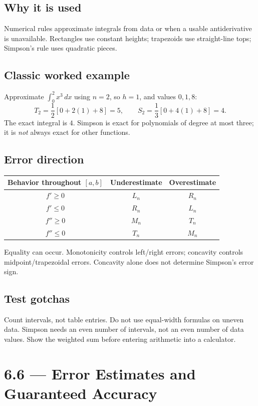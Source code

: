 \documentclass[11pt]{article}
\newcommand{\topic}[2]{\clearpage\section*{#1 --- #2}}
\newcommand{\dx}{\,dx}
\begin{document}
\subsection*{Why it is used}
Numerical rules approximate integrals from data or when a usable antiderivative is unavailable. Rectangles use constant heights; trapezoids use straight-line tops; Simpson's rule uses quadratic pieces.

\subsection*{Classic worked example}
Approximate $\int_0^2x^3\dx$ using $n=2$, so $h=1$, and values $0,1,8$:
\[
T_2=\frac12[0+2(1)+8]=5,\qquad
S_2=\frac13[0+4(1)+8]=4.
\]
The exact integral is $4$. Simpson is exact for polynomials of degree at most three; it is \emph{not} always exact for other functions.

\subsection*{Error direction}
\begin{center}
\begin{tabular}{c|cc}
\textbf{Behavior throughout $[a,b]$}&\textbf{Underestimate}&\textbf{Overestimate}\\\hline
$f'\ge0$&$L_n$&$R_n$\\
$f'\le0$&$R_n$&$L_n$\\
$f''\ge0$&$M_n$&$T_n$\\
$f''\le0$&$T_n$&$M_n$
\end{tabular}
\end{center}
Equality can occur. Monotonicity controls left/right errors; concavity controls midpoint/trapezoidal errors. Concavity alone does not determine Simpson's error sign.

\subsection*{Test gotchas}
Count intervals, not table entries. Do not use equal-width formulas on uneven data. Simpson needs an even number of intervals, not an even number of data values. Show the weighted sum before entering arithmetic into a calculator.

\topic{6.6}{Error Estimates and Guaranteed Accuracy}
\end{document}
